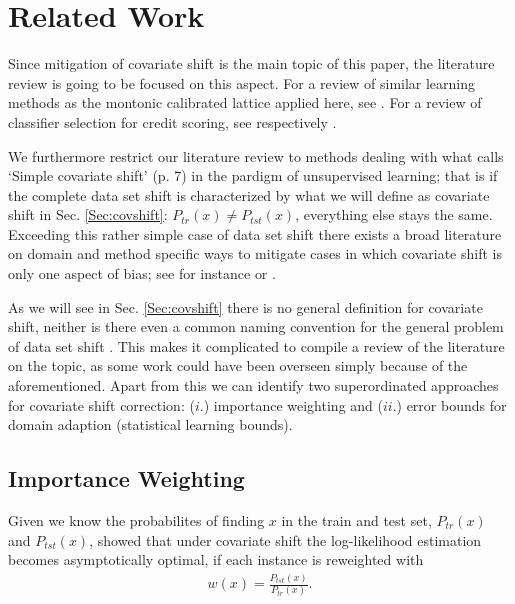 \section{Related Work}\label{Sec:Relwork}

Since mitigation of covariate shift is the main topic of this paper, the literature review is going to be focused on this aspect. For a review of similar learning methods as the montonic calibrated lattice applied here, see \citep{gupta2016monotonic}. For a review of classifier selection for credit scoring, see \cite{baesens2003benchmarking} respectively \citep{lessmann2015benchmarking}.

We furthermore restrict our literature review to methods dealing with what \citep{storkey2009training} calls `Simple covariate shift' (p. 7) in the pardigm of unsupervised learning; that is if the complete data set shift is characterized by what we will define as covariate shift in Sec. \ref{Sec:covshift}: $P_{tr}(x) \neq P_{tst}(x)$, everything else stays the same. Exceeding this rather simple case of data set shift there exists a broad literature on domain and method specific ways to mitigate cases in which covariate shift is only one aspect of bias; see for instance \citep{kato2020off} or \citep{johansson2018learning}.

As we will see in Sec. \ref{Sec:covshift} there is no general definition for covariate shift, neither is there even a common naming convention for the general problem of data set shift \citep{moreno2012unifying}. This makes it complicated to compile a review of the literature on the topic, as some work could have been overseen simply because of the aforementioned. Apart from this we can identify two superordinated approaches for covariate shift correction: ($i$.) importance weighting and ($ii$.) error bounds for domain adaption (statistical learning bounds).


\subsection*{Importance Weighting}

Given we know the probabilites of finding $x$ in the train and test set, $P_{tr}(x)$ and $P_{tst}(x)$, \citep{shimodaira2000improving} showed that under covariate shift the log-likelihood estimation becomes asymptotically optimal, if each instance is reweighted with 
\begin{align*}
	w(x) = \frac{P_{tst}(x)}{P_{tr}(x)}. 
\end{align*}

